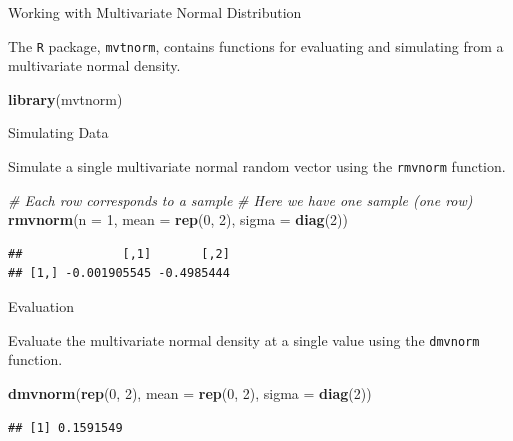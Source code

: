 \documentclass[
  ignorenonframetext,
]{beamer}
\newenvironment{Shaded}{\begin{snugshade}}{\end{snugshade}}
\newcommand{\CommentTok}[1]{\textcolor[rgb]{0.56,0.35,0.01}{\textit{#1}}}
\newcommand{\DataTypeTok}[1]{\textcolor[rgb]{0.13,0.29,0.53}{#1}}
\newcommand{\DecValTok}[1]{\textcolor[rgb]{0.00,0.00,0.81}{#1}}
\newcommand{\KeywordTok}[1]{\textcolor[rgb]{0.13,0.29,0.53}{\textbf{#1}}}
\newcommand{\NormalTok}[1]{#1}
\begin{document}
\begin{frame}[fragile]{Working with Multivariate Normal Distribution}
\protect\hypertarget{working-with-multivariate-normal-distribution}{}

The \texttt{R} package, \texttt{mvtnorm}, contains functions for
evaluating and simulating from a multivariate normal density.

\begin{Shaded}
\begin{Highlighting}[]
\KeywordTok{library}\NormalTok{(mvtnorm)}
\end{Highlighting}
\end{Shaded}

\end{frame}

\begin{frame}[fragile]{Simulating Data}
\protect\hypertarget{simulating-data}{}

Simulate a single multivariate normal random vector using the
\texttt{rmvnorm} function.

\begin{Shaded}
\begin{Highlighting}[]
\CommentTok{# Each row corresponds to a sample}
\CommentTok{# Here we have one sample (one row)}
\KeywordTok{rmvnorm}\NormalTok{(}\DataTypeTok{n =} \DecValTok{1}\NormalTok{, }\DataTypeTok{mean =} \KeywordTok{rep}\NormalTok{(}\DecValTok{0}\NormalTok{, }\DecValTok{2}\NormalTok{), }\DataTypeTok{sigma =} \KeywordTok{diag}\NormalTok{(}\DecValTok{2}\NormalTok{))}
\end{Highlighting}
\end{Shaded}

\begin{verbatim}
##              [,1]       [,2]
## [1,] -0.001905545 -0.4985444
\end{verbatim}

\end{frame}

\begin{frame}[fragile]{Evaluation}
\protect\hypertarget{evaluation}{}

Evaluate the multivariate normal density at a single value using the
\texttt{dmvnorm} function.

\begin{Shaded}
\begin{Highlighting}[]
\KeywordTok{dmvnorm}\NormalTok{(}\KeywordTok{rep}\NormalTok{(}\DecValTok{0}\NormalTok{, }\DecValTok{2}\NormalTok{), }\DataTypeTok{mean =} \KeywordTok{rep}\NormalTok{(}\DecValTok{0}\NormalTok{, }\DecValTok{2}\NormalTok{), }\DataTypeTok{sigma =} \KeywordTok{diag}\NormalTok{(}\DecValTok{2}\NormalTok{))}
\end{Highlighting}
\end{Shaded}

\begin{verbatim}
## [1] 0.1591549
\end{verbatim}

\end{frame}
\end{document}

